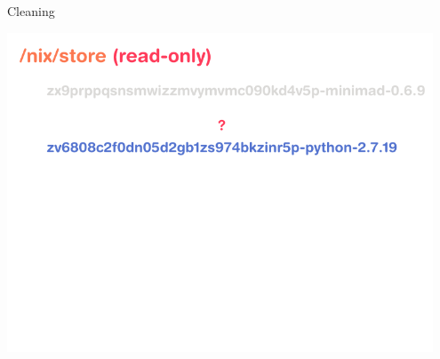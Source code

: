 \documentclass[t, aspectratio=169]{beamer}
\begin{document}
\begin{frame}{Cleaning}
{\begin{center}
        \end{center}
    }
     {
        \begin{center}
            \includegraphics[width=0.95\textwidth]{img/schema-nix-store-cleaning-4.pdf}
        \end{center}
     }


\end{frame}
\end{document}
